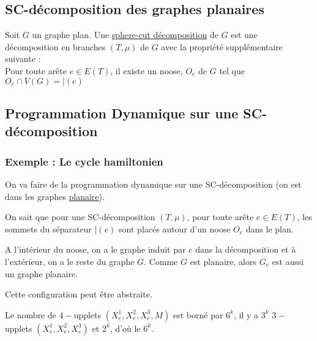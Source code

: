 \documentclass[a4paper, 11pt]{thesis}
\begin{document}
\subsection{SC-décomposition des graphes planaires}

\begin{df}
    Soit $G$ un graphe plan. Une \underline{sphere-cut décomposition} de $G$ est une décomposition
    en branches $(T, \mu)$ de $G$ avec la propriété supplémentaire suivante : \\

    Pour toute arête $e \in E(T)$, il existe un noose, $O_e$ de $G$ tel que $O_e \cap V(G) =
    \mid(e)$
\end{df}

\subsection{Programmation Dynamique sur une SC-décomposition}


\subsubsection{Exemple : Le cycle hamiltonien}


On va faire de la programmation dynamique sur une SC-décomposition (on est dans les graphes
\underline{planaire}).

On sait que pour une SC-décomposition $(T, \mu)$, pour toute arête $e \in E(T)$, les sommets du
séparateur $\mid(e)$ sont placés autour d'un noose $O_e$ dans le plan.


A l'intérieur du noose, on a le graphe induit par $e$ dans la décomposition et à l'extérieur, on a
le reste du graphe $G$. Comme $G$ est planaire, alors $G_e$ est aussi un graphe planaire.

Cette configuration peut être abstraite. %


Le nombre de $4-$upplets $(X_e^1, X_e^2, X_e^3, M)$ est borné par $6^k$, il y a $3^k$ $3-$upplets
$(X_e^1, X_e^2, X_e^3)$ et $2^k$, d'où le $6^k$.
\end{document}
